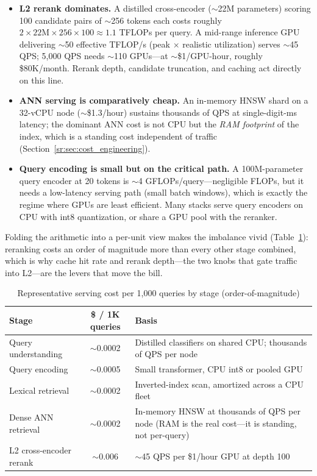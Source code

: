 \begin{itemize}
    \item \textbf{L2 rerank dominates.} A distilled cross-encoder ($\sim$22M parameters) scoring 100 candidate pairs of $\sim$256 tokens each costs roughly $2 \times 22\text{M} \times 256 \times 100 \approx 1.1$ TFLOPs per query. A mid-range inference GPU delivering $\sim$50 effective TFLOP/s (peak $\times$ realistic utilization) serves $\sim$45 QPS; 5{,}000 QPS needs $\sim$110 GPUs---at $\sim$\$1/GPU-hour, roughly \$80K/month. Rerank depth, candidate truncation, and caching act directly on this line.
    \item \textbf{ANN serving is comparatively cheap.} An in-memory HNSW shard on a 32-vCPU node ($\sim$\$1.3/hour) sustains thousands of QPS at single-digit-ms latency; the dominant ANN cost is not CPU but the \textit{RAM footprint} of the index, which is a standing cost independent of traffic (Section~\ref{sr:sec:cost_engineering}).
    \item \textbf{Query encoding is small but on the critical path.} A 100M-parameter query encoder at 20 tokens is $\sim$4 GFLOPs/query---negligible FLOPs, but it needs a low-latency serving path (small batch windows), which is exactly the regime where GPUs are least efficient. Many stacks serve query encoders on CPU with int8 quantization, or share a GPU pool with the reranker.
\end{itemize}

Folding the arithmetic into a per-unit view makes the imbalance vivid (Table~\ref{sr:tab:stage_costs}): reranking costs an order of magnitude more than every other stage combined, which is why cache hit rate and rerank depth---the two knobs that gate traffic into L2---are the levers that move the bill.

\begin{table}[H]
\centering
\small
\caption{Representative serving cost per 1{,}000 queries by stage (order-of-magnitude)}
\label{sr:tab:stage_costs}
\begin{tabularx}{\textwidth}{lcX}
\toprule
\textbf{Stage} & \textbf{\$ / 1K queries} & \textbf{Basis} \\
\midrule
Query understanding & $\sim$0.0002 & Distilled classifiers on shared CPU; thousands of QPS per node \\
Query encoding & $\sim$0.0005 & Small transformer, CPU int8 or pooled GPU \\
Lexical retrieval & $\sim$0.0002 & Inverted-index scan, amortized across a CPU fleet \\
Dense ANN retrieval & $\sim$0.0002 & In-memory HNSW at thousands of QPS per node (RAM is the real cost---it is standing, not per-query) \\
L2 cross-encoder rerank & $\sim$0.006 & $\sim$45 QPS per \$1/hour GPU at depth 100 \\
\bottomrule
\end{tabularx}
\end{table}

